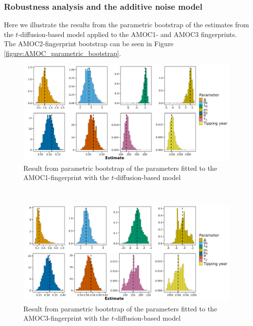 \subsubsection{Robustness analysis and the additive noise model}\label{subsubsec:RobustnessAnalysisAppendix}
Here we illustrate the results from the parametric bootstrap of the estimates from the $t$-diffusion-based model applied to the AMOC1- and AMOC3 fingerprints. The AMOC2-fingerprint bootstrap can be seen in Figure \ref{figure:AMOC_parametric_bootstrap}.
\begin{figure}[h!]
    \begin{center}
        \includegraphics[scale = .09]{figures/estim_tibble_AMOC1_plot.jpeg}
        \caption{Result from parametric bootstrap of the parameters fitted to the AMOC1-fingerprint with the $t$-diffusion-based model}
        \label{figure:AMOC1_t_diffusion_bootstrap}
    \end{center}
\end{figure}\\
\begin{figure}[h!]
    \begin{center}
        \includegraphics[scale = .09]{figures/estim_tibble_AMOC3_plot.jpeg}
        \caption{Result from parametric bootstrap of the parameters fitted to the AMOC3-fingerprint with the $t$-diffusion-based model}
        \label{figure:AMOC3_t_diffusion_bootstrap}
    \end{center}
\end{figure}\\
